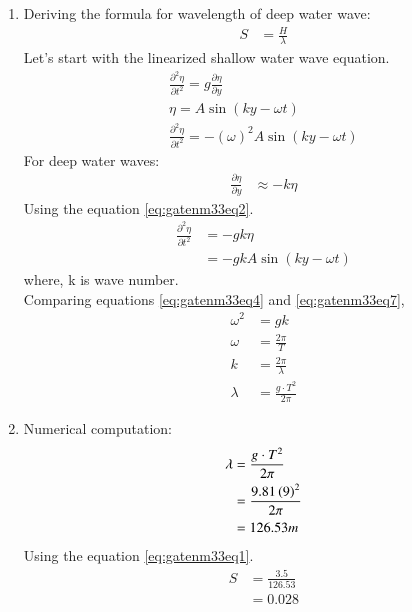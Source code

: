 \documentclass[journal,12pt,onecolumn]{IEEEtran}
\theoremstyle{remark}
\begin{document}
\begin{enumerate}
 \item Deriving the formula for wavelength of deep water wave:\\
\begin{align}
S&=\frac{H}{\lambda} \label{eq:gatenm33eq1}
\end{align}
Let's start with the linearized shallow water wave equation.\\
\begin{align}
\frac{\partial^2 \eta}{\partial t^2}=g \frac{\partial \eta}{\partial y}\label{eq:gatenm33eq2}\\
\eta = A\sin(ky - \omega t) \label{eq:gatenm33eq3} \\
\frac{\partial^2 \eta}{\partial t^2} = -(\omega)^2 A\sin(ky - \omega t) \label{eq:gatenm33eq4}
\end{align}
For deep water waves:\\ 
\begin{align}
\frac{\partial \eta}{\partial y} &\approx -k\eta \label{eq:gatenm33eq5}
\end{align}
Using the equation \eqref{eq:gatenm33eq2}.
\begin{align}
\frac{\partial^2 \eta}{\partial t^2}&=-gk\eta \label{eq:gatenm33eq6}\\
&=-gk A\sin(ky - \omega t) \label{eq:gatenm33eq7}
\end{align}
where, k is wave number. \\

Comparing equations \eqref{eq:gatenm33eq4} and \eqref{eq:gatenm33eq7},\\
\begin{align}
\omega^2 &= gk \label{eq:gatenm33eq8} \\
\omega &= \frac{2 \pi}{T} \label{eq:gatenm33eq9} \\
k &= \frac{2 \pi}{\lambda} \label{eq:gatenm33eq10} \\
\lambda &= \frac{g \cdot T^2}{2 \pi} \label{eq:gatenm33eq11}
\end{align}
\item Numerical computation:\\
\begin{align}
\lambda&=\frac{g \cdot T^2}{2\pi}\\ 
&=\frac{9.81 \left(9\right)^2}{2\pi}\\ 
&=126.53m 
\end{align}
Using the equation \eqref{eq:gatenm33eq1}.\\
\begin{align}
S&=\frac{3.5}{126.53}\\ 
&=0.028 
\end{align}
\end{enumerate}
\end{document}
